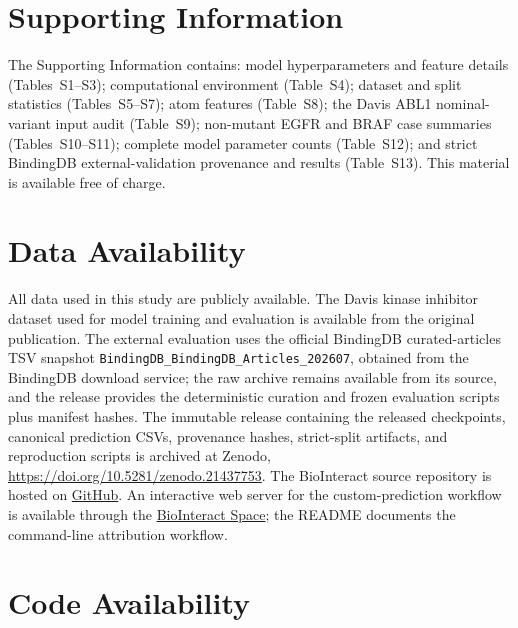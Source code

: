 \documentclass[fleqn,10pt]{wlscirep}
\begin{document}
\section*{Supporting Information}

\begingroup\color{red}
The Supporting Information contains: model hyperparameters and feature details
(Tables~S1--S3); computational environment (Table~S4); dataset and split
statistics (Tables~S5--S7); atom features (Table~S8); the Davis ABL1
nominal-variant input audit (Table~S9); non-mutant EGFR and BRAF case summaries
(Tables~S10--S11); complete model parameter counts (Table~S12); and strict
BindingDB external-validation provenance and results (Table~S13).
\endgroup
This material is available free of charge.

\section*{Data Availability}

All data used in this study are publicly available. The Davis kinase inhibitor
dataset used for model training and evaluation is available from the original
publication.\cite{davis2011comprehensive}
\begingroup\color{red}The external evaluation uses the official BindingDB
curated-articles TSV snapshot \texttt{BindingDB\_BindingDB\_Articles\_202607},
obtained from the BindingDB download service;\cite{gilson2016bindingdb} the raw
archive remains available from its source, and the release provides the
deterministic curation and frozen evaluation scripts plus manifest hashes.\endgroup{}
The immutable release containing the
released checkpoints, canonical prediction CSVs, provenance hashes, strict-split
artifacts, and reproduction scripts is archived at Zenodo,
\url{https://doi.org/10.5281/zenodo.21437753}. The BioInteract source repository
is hosted on \href{https://github.com/Liubo-520/bio-intelligence}{GitHub}. An interactive web
server for the custom-prediction workflow is available through the
\href{https://huggingface.co/spaces/AI4deeperScience/BioInteract}{BioInteract Space}; the README
documents the command-line attribution workflow.

\begingroup\color{red}
\section*{Code Availability}
\end{document}
